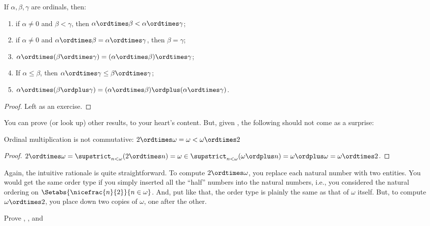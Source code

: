 \documentclass[../../../include/open-logic-section]{subfiles}
\begin{document}
\begin{lem}
If $\alpha, \beta, \gamma$ are ordinals, then:
\begin{enumerate}
	\item{} if $\alpha \neq 0$ and $\beta < \gamma$,
	then $\alpha \ordtimes \beta < \alpha \ordtimes \gamma$;
	\item{} if $\alpha \neq 0$ and $\alpha \ordtimes
	\beta = \alpha\ordtimes\gamma$, then $\beta = \gamma$;
	\item{}  $\alpha \ordtimes (\beta \ordtimes
	\gamma) = (\alpha \ordtimes \beta) \ordtimes \gamma$;
	\item{}  If $\alpha \leq \beta$, then $\alpha
	\ordtimes \gamma \leq \beta \ordtimes \gamma$;
	\item{}  $\alpha \ordtimes (\beta \ordplus
	\gamma) = (\alpha \ordtimes \beta )\ordplus (\alpha\ordtimes
	\gamma)$.
\end{enumerate}
\end{lem}

\begin{proof}
Left as an exercise.
\end{proof}

You can prove (or look up) other results, to your heart's content.
But, given
, the
following should not come as a surprise:

\begin{prop}
Ordinal multiplication is not commutative: $2 \ordtimes \omega  =
\omega < \omega \ordtimes 2$
\end{prop}

\begin{proof}
$2 \ordtimes \omega = \supstrict_{n < \omega}(2\ordtimes  n) = \omega \in \supstrict_{n < \omega}(\omega \ordplus n) = \omega \ordplus \omega = \omega \ordtimes 2$.
\end{proof}
\noindent 
Again, the intuitive rationale is quite straightforward. To compute $2
\ordtimes \omega$, you replace each natural number with two entities.
You would get the same order type if you simply inserted all the
``half'' numbers into the natural numbers, i.e., you considered the
natural ordering on $\Setabs{\nicefrac{n}{2}}{n \in \omega}$. And, put
like that, the order type is plainly the same as that of $\omega$
itself. But, to compute $\omega \ordtimes 2$, you place down two
copies of $\omega$, one after the other. 

\begin{prob}
Prove
,
,
and
\end{prob}
\end{document}
